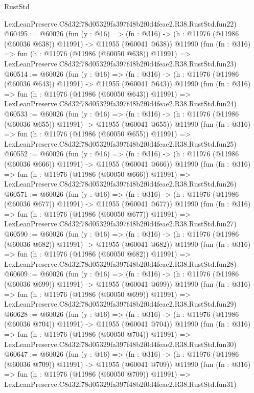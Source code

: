 \begin{lexlean}{RustStd}
\begin{coremodule}
    LexLeanPreserve.C8d32f78d05329fa397f48b2f0d4feae2.R38.RustStd.fun22)
@60495 := @60026
    (fun (y : @16) =>
    (fn : @316) -> (h : @11976 (@11986 (@60036 @638)) @11991) -> @11955 (@60041 @638))
    @11990
    (fun (fn : @316) =>
    fun (h : @11976 (@11986 (@60050 @638)) @11991) =>
    LexLeanPreserve.C8d32f78d05329fa397f48b2f0d4feae2.R38.RustStd.fun23)
@60514 := @60026
    (fun (y : @16) =>
    (fn : @316) -> (h : @11976 (@11986 (@60036 @643)) @11991) -> @11955 (@60041 @643))
    @11990
    (fun (fn : @316) =>
    fun (h : @11976 (@11986 (@60050 @643)) @11991) =>
    LexLeanPreserve.C8d32f78d05329fa397f48b2f0d4feae2.R38.RustStd.fun24)
@60533 := @60026
    (fun (y : @16) =>
    (fn : @316) -> (h : @11976 (@11986 (@60036 @655)) @11991) -> @11955 (@60041 @655))
    @11990
    (fun (fn : @316) =>
    fun (h : @11976 (@11986 (@60050 @655)) @11991) =>
    LexLeanPreserve.C8d32f78d05329fa397f48b2f0d4feae2.R38.RustStd.fun25)
@60552 := @60026
    (fun (y : @16) =>
    (fn : @316) -> (h : @11976 (@11986 (@60036 @666)) @11991) -> @11955 (@60041 @666))
    @11990
    (fun (fn : @316) =>
    fun (h : @11976 (@11986 (@60050 @666)) @11991) =>
    LexLeanPreserve.C8d32f78d05329fa397f48b2f0d4feae2.R38.RustStd.fun26)
@60571 := @60026
    (fun (y : @16) =>
    (fn : @316) -> (h : @11976 (@11986 (@60036 @677)) @11991) -> @11955 (@60041 @677))
    @11990
    (fun (fn : @316) =>
    fun (h : @11976 (@11986 (@60050 @677)) @11991) =>
    LexLeanPreserve.C8d32f78d05329fa397f48b2f0d4feae2.R38.RustStd.fun27)
@60590 := @60026
    (fun (y : @16) =>
    (fn : @316) -> (h : @11976 (@11986 (@60036 @682)) @11991) -> @11955 (@60041 @682))
    @11990
    (fun (fn : @316) =>
    fun (h : @11976 (@11986 (@60050 @682)) @11991) =>
    LexLeanPreserve.C8d32f78d05329fa397f48b2f0d4feae2.R38.RustStd.fun28)
@60609 := @60026
    (fun (y : @16) =>
    (fn : @316) -> (h : @11976 (@11986 (@60036 @699)) @11991) -> @11955 (@60041 @699))
    @11990
    (fun (fn : @316) =>
    fun (h : @11976 (@11986 (@60050 @699)) @11991) =>
    LexLeanPreserve.C8d32f78d05329fa397f48b2f0d4feae2.R38.RustStd.fun29)
@60628 := @60026
    (fun (y : @16) =>
    (fn : @316) -> (h : @11976 (@11986 (@60036 @704)) @11991) -> @11955 (@60041 @704))
    @11990
    (fun (fn : @316) =>
    fun (h : @11976 (@11986 (@60050 @704)) @11991) =>
    LexLeanPreserve.C8d32f78d05329fa397f48b2f0d4feae2.R38.RustStd.fun30)
@60647 := @60026
    (fun (y : @16) =>
    (fn : @316) -> (h : @11976 (@11986 (@60036 @709)) @11991) -> @11955 (@60041 @709))
    @11990
    (fun (fn : @316) =>
    fun (h : @11976 (@11986 (@60050 @709)) @11991) =>
    LexLeanPreserve.C8d32f78d05329fa397f48b2f0d4feae2.R38.RustStd.fun31)

\end{coremodule}
\end{lexlean}
